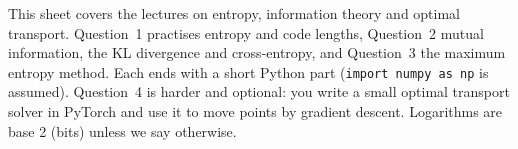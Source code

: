 \documentclass{sotonExamBoxes}    %
\begin{document}

\maketitle

This sheet covers the lectures on entropy, information theory and
optimal transport.  Question~1 practises entropy and code lengths,
Question~2 mutual information, the KL divergence and cross-entropy, and
Question~3 the maximum entropy method.  Each ends with a short Python
part (\texttt{import numpy as np} is assumed).  Question~4 is harder and
optional: you write a small optimal transport solver in PyTorch and use
it to move points by gradient descent.  Logarithms are base 2 (bits)
unless we say otherwise.

\end{document}
